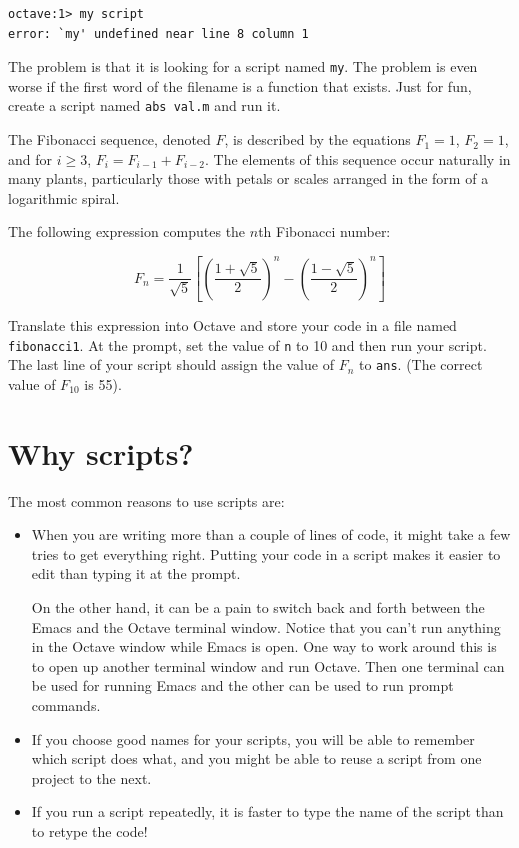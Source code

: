 \documentclass{book}
\begin{document}
\begin{verbatim}
octave:1> my script
error: `my' undefined near line 8 column 1
\end{verbatim}

The problem is that it is looking for a script named {\tt my}. The
problem is even worse if the first word of the filename is a function
that exists. Just for fun, create a script named {\tt abs val.m}
and run it.

\begin{ex}
The Fibonacci sequence, denoted $F$, is described by the equations
$F_1 = 1$, $F_2 = 1$, and for $i \ge 3$, $F_{i} = F_{i-1} + F_{i-2}$.
The elements of this sequence occur naturally in many plants,
particularly those with petals or scales arranged in the form of a
logarithmic spiral.

The following expression computes the
$n$th Fibonacci number:

\begin{equation}
F_n = \frac{1}{\sqrt{5}}
\left[ 
\left( \frac{1 + \sqrt{5}}{2} \right)^{n} -
\left( \frac{1 - \sqrt{5}}{2} \right)^{n}
\right]
\end{equation}

Translate this expression into Octave and store your
code in a file named {\tt fibonacci1}. At the prompt, set the value
of {\tt n} to 10 and then run your script. The last line of your
script should assign the value of $F_n$ to {\tt ans}.
(The correct value of $F_{10}$ is 55).
\end{ex}


\section{Why scripts?}

The most common reasons to use scripts are:

\begin{itemize}

\item When you are writing more than a couple of lines of code, it
might take a few tries to get everything right. Putting your code
in a script makes it easier to edit than typing it at the prompt.

On the other hand, it can be a pain to switch back and forth between
the Emacs and the Octave terminal window. Notice that you can't run anything
in the Octave window while Emacs is open. One way to work around this is to
open up another terminal window and run Octave. Then one terminal can be used
for running Emacs and the other can be used to run prompt commands.

\item If you choose good names for your scripts, you will be able
to remember which script does what, and you might be able to reuse
a script from one project to the next.

\item If you run a script repeatedly, it is faster to type the
name of the script than to retype the code!

\end{itemize}
\end{document}
